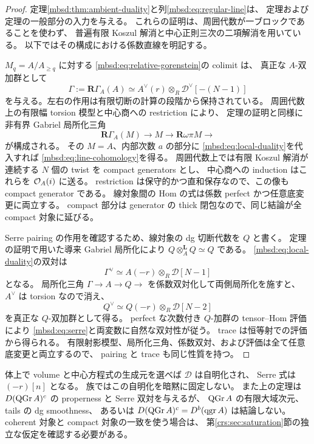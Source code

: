 \begin{proof}
定理\ref{mbsd:thm:ambient-duality}と列\eqref{mbsd:eq:regular-line}は、
定理および
定理の一般部分の入力を与える。
これらの証明は、周囲代数が一ブロックであることを使わず、
普遍有限 Koszul 解消と中心正則三次の二項解消を用いている。
以下ではその構成における係数直線を明記する。

$M_q=A/A_{\geq q}$ に対する \eqref{mbsd:eq:relative-gorenstein}の colimit は、
真正な $A$-双加群として
\begin{equation}\label{mbsd:eq:local-duality}
 \Gamma:=\mathbf R\Gamma_A(A)
 \simeq A^\vee(r)\otimes_R\mathscr D^\vee[-(N-1)]
\end{equation}
を与える。左右の作用は有限切断の計算の段階から保持されている。
周囲代数上の有限幅 torsion 模型と中心商への restriction により、
定理の証明と同様に
非有界 Gabriel 局所化三角
\[
 \mathbf R\Gamma_A(M)\longrightarrow M\longrightarrow
 \mathbf R\omega\pi M\longrightarrow
\]
が構成される。
その $M=A$、内部次数 $a$ の部分に \eqref{mbsd:eq:local-duality}を代入すれば
\eqref{mbsd:eq:line-cohomology}を得る。
周囲代数上では有限 Koszul 解消が連続する $N$ 個の twist を compact generators とし、
中心商への induction はこれらを $\mathcal O_A(i)$ に送る。
restriction は保守的かつ直和保存なので、この像も compact generator である。
線対象間の Hom の式は係数 perfect かつ任意底変更に両立する。
compact 部分は generator の thick 閉包なので、同じ結論が全 compact 対象に延びる。

Serre pairing の作用を確認するため、線対象の dg 切断代数を $Q$ と書く。
定理の証明で用いた導来 Gabriel 局所化により
$Q\otimes_A^{\mathbf L}Q\simeq Q$ である。
\eqref{mbsd:eq:local-duality}の双対は
\[
 \Gamma^\vee\simeq A(-r)\otimes_R\mathscr D[N-1]
\]
となる。
局所化三角 $\Gamma\to A\to Q\to$ を係数双対化して両側局所化を施すと、
$A^\vee$ は torsion なので消え、
\[
 Q^\vee\simeq Q(-r)\otimes_R\mathscr D[N-2]
\]
を真正な $Q$-双加群として得る。
perfect な次数付き $Q$-加群の tensor--Hom 評価により
\eqref{mbsd:eq:serre}と両変数に自然な双対性が従う。
trace は恒等射での評価から得られる。
有限射影模型、局所化三角、係数双対、および評価は全て任意底変更と両立するので、
pairing と trace も同じ性質を持つ。
\end{proof}

\begin{remark}[主張する範囲]
体上で volume と中心方程式の生成元を選べば $\mathscr D$ は自明化され、
Serre 式は $(-r)[n]$ となる。
族ではこの自明化を暗黙に固定しない。
また上の定理は $D(\operatorname{QGr} A)^c$ の properness と Serre 双対を与えるが、
$\operatorname{QGr} A$ の有限大域次元、tails の dg smoothness、
あるいは $D(\operatorname{QGr} A)^c=D^b(\operatorname{qgr} A)$ は結論しない。
coherent 対象と compact 対象の一致を使う場合は、
第\ref{crs:sec:saturation}節の独立な仮定を確認する必要がある。
\end{remark}

